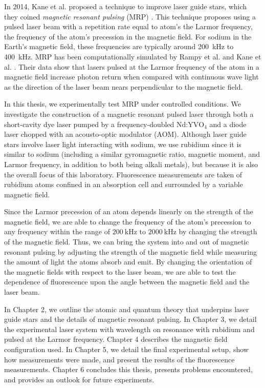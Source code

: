 In 2014, Kane et al. proposed a technique to improve laser guide stars, which they coined \textit{magnetic resonant pulsing} (MRP) \cite{Kane2014}. This technique proposes using a pulsed laser beam with a repetition rate equal to atom's the Larmor frequency, the frequency of the atom's precession in the magnetic field. For sodium in the Earth's magnetic field, these frequencies are typically around \SI{200}{\kilo Hz} to \SI{400}{\kilo Hz}. MRP has been computationally simulated by Rampy et al. and Kane et al. \cite{Rampy2010,Kane2014}. Their data show that lasers pulsed at the Larmor frequency of the atom in a magnetic field increase photon return when compared with continuous wave light as the direction of the laser beam nears perpendicular to the magnetic field.

In this thesis, we experimentally test MRP under controlled conditions. We investigate the construction of a magnetic resonant pulsed laser through both a short-cavity dye laser pumped by a frequency-doubled $\text{Nd:YVO}_4$ and a diode laser chopped with an acousto-optic modulator (AOM). Although laser guide stars involve laser light interacting with sodium, we use rubidium since it is similar to sodium (including a similar gyromagnetic ratio, magnetic moment, and Larmor frequency, in addition to both being alkali metals), but because it is also the overall focus of this laboratory. Fluorescence measurements are taken of rubidium atoms confined in an absorption cell and surrounded by a variable magnetic field. 


Since the Larmor precession of an atom depends linearly on the strength of the magnetic field, we are able to change the frequency of the atom's precession to any frequency within the range of $\SI{200}{\kilo \hertz}$ to $\SI{2000}{\kilo \hertz}$ by changing the strength of the magnetic field. Thus, we can bring the system into and out of magnetic resonant pulsing by adjusting the strength of the magnetic field while measuring the amount of light the atoms absorb and emit. By changing the orientation of the magnetic fields with respect to the laser beam, we are able to test the dependence of fluorescence upon the angle between the magnetic field and the laser beam. 

In Chapter 2, we outline the atomic and quantum theory that underpins laser guide stars and the details of magnetic resonant pulsing. In Chapter 3, we detail the experimental laser system with wavelength on resonance with rubidium and pulsed at the Larmor frequency. Chapter 4 describes the magnetic field configuration used. In Chapter 5, we detail the final experimental setup, show how measurements were made, and present the results of the fluorescence measurements. Chapter 6 concludes this thesis, presents problems encountered, and provides an outlook for future experiments.


